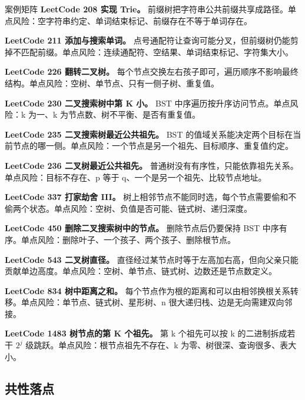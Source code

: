 \begin{principlebox}{案例矩阵}
\textbf{LeetCode 208 实现 Trie。}
前缀树把字符串公共前缀共享成路径。单点风险：空字符串约定、单词结束标记、前缀存在不等于单词存在。

\textbf{LeetCode 211 添加与搜索单词。}
点号通配符让查询可能分叉，但前缀树仍能剪掉不匹配前缀。单点风险：连续通配符、空结果、单词结束标记、字符集大小。

\textbf{LeetCode 226 翻转二叉树。}
每个节点交换左右孩子即可，遍历顺序不影响最终结构。单点风险：空树、单节点、只有一侧子树、重复值。

\textbf{LeetCode 230 二叉搜索树中第 K 小。}
BST 中序遍历按升序访问节点。单点风险：k 为一、k 为节点数、树不平衡、是否有重复值。

\textbf{LeetCode 235 二叉搜索树最近公共祖先。}
BST 的值域关系能决定两个目标在当前节点的哪一侧。单点风险：一个节点是另一个祖先、目标顺序、重复值约定。

\textbf{LeetCode 236 二叉树最近公共祖先。}
普通树没有有序性，只能依靠祖先关系。单点风险：目标不存在、p 等于 q、一个是另一个祖先、比较节点地址。

\textbf{LeetCode 337 打家劫舍 III。}
树上相邻节点不能同时选，每个节点需要偷和不偷两个状态。单点风险：空树、负值是否可能、链式树、递归深度。

\textbf{LeetCode 450 删除二叉搜索树中的节点。}
删除节点后仍要保持 BST 中序有序。单点风险：删除叶子、一个孩子、两个孩子、删除根节点。

\textbf{LeetCode 543 二叉树直径。}
直径经过某节点时等于左高加右高，但向父亲只能贡献单边高度。单点风险：空树、单节点、链式树、边数还是节点数定义。

\textbf{LeetCode 834 树中距离之和。}
每个节点作为根的距离和可以由相邻换根关系转移。单点风险：单节点、链式树、星形树、n 很大递归栈、边是无向需建双向邻接。

\textbf{LeetCode 1483 树节点的第 K 个祖先。}
第 k 个祖先可以按 k 的二进制拆成若干 \ensuremath{2^{j}} 级跳跃。单点风险：根节点祖先不存在、k 为零、树很深、查询很多、表大小。

\end{principlebox}

\subsection{共性落点}

